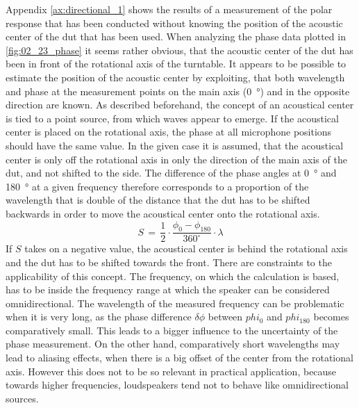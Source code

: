 Appendix \ref{ax:directional_1} shows the results of a measurement of the polar response that has been conducted without knowing the position of the acoustic center of the \gls{dut} that has been used.
When analyzing the phase data plotted in \autoref{fig:02_23_phase} it seems rather obvious, that the acoustic center of the \gls{dut} has been in front of the rotational axis of the turntable. 
It appears to be possible to estimate the position of the acoustic center by exploiting, that both wavelength and phase at the measurement points on the main axis (\SI{0}{\degree}) and in the opposite direction are known. As described beforehand, the concept of an acoustical center is tied to a  point source, from which waves appear to emerge. If the acoustical center is placed  on the rotational axis, the phase at all microphone positions should have the same value. In the given case it is assumed, that the acoustical center is only off the rotational axis in only the direction of the main axis of the \gls{dut}, and not shifted to the side.
The difference of the phase angles at \SI{0}{\degree} and \SI{180}{\degree} at a given frequency therefore corresponds to a proportion of the wavelength that is double of the distance that the \gls{dut} has to be shifted backwards in order to move the acoustical center onto the rotational axis.
\begin{equation}
S\,=\,\frac{1}{2}\cdot\frac{\phi_0-\phi_{180}}{360^\circ}\cdot\lambda
\end{equation}
\startexplain
\stopexplain    
If \(S\) takes on a negative value, the acoustical center is behind the rotational axis and the \gls{dut} has to be shifted towards the front. There are constraints to the applicability of this concept. The frequency, on which the calculation is based, has to be inside the frequency range at which the speaker can be considered omnidirectional.
The wavelength of the measured frequency can be problematic when it is very long, as the phase difference \(\delta\phi\) between \(phi_0\) and \(phi_{180}\) becomes comparatively small. This leads to a bigger influence to the uncertainty of the phase measurement. On the other hand, comparatively short wavelengths may lead to aliasing effects, when there is a big offset of the center from the rotational axis. However this does not to be so relevant in practical application, because towards higher frequencies, loudspeakers tend not to behave like omnidirectional sources.\\
